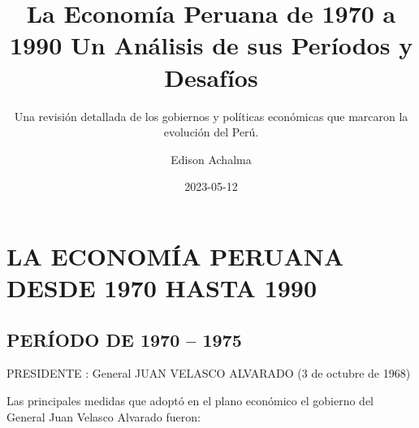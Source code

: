 \documentclass[
  letterpaper,
  DIV=11,
  numbers=noendperiod]{scrartcl}
\title{La Economía Peruana de 1970 a 1990 Un Análisis de sus Períodos y
Desafíos}
\subtitle{Una revisión detallada de los gobiernos y políticas económicas
que marcaron la evolución del Perú.}
\author{Edison Achalma}
\date{2023-05-12}
\begin{document}
\maketitle
\ifdefined\Shaded\renewenvironment{Shaded}{\begin{tcolorbox}[breakable, enhanced, interior hidden, borderline west={3pt}{0pt}{shadecolor}, boxrule=0pt, sharp corners, frame hidden]}{\end{tcolorbox}}\fi

\hypertarget{la-economuxeda-peruana-desde-1970-hasta-1990}{%
\section{LA ECONOMÍA PERUANA DESDE 1970 HASTA
1990}\label{la-economuxeda-peruana-desde-1970-hasta-1990}}

\hypertarget{peruxedodo-de-1970-1975}{%
\subsection{PERÍODO DE 1970 -- 1975}\label{peruxedodo-de-1970-1975}}

PRESIDENTE : General JUAN VELASCO ALVARADO (3 de octubre de 1968)

Las principales medidas que adoptó en el plano económico el gobierno del
General Juan Velasco Alvarado fueron:
\end{document}
